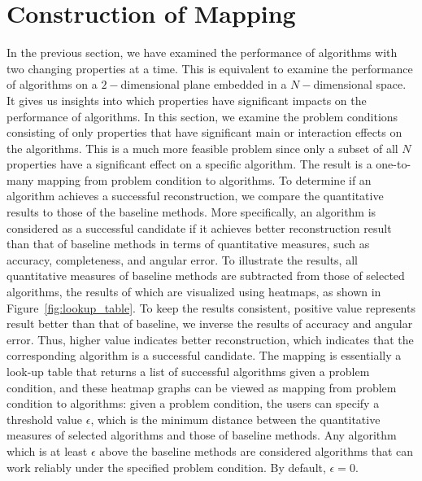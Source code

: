 \section{Construction of Mapping}
\label{sec:lookup_table}
In the previous section, we have examined the performance of algorithms with two changing properties at a time. This is equivalent to examine the performance of algorithms on a $2-$dimensional plane embedded in a $N-$dimensional space. It gives us insights into which properties have significant impacts on the performance of algorithms. In this section, we examine the problem conditions consisting of only properties that have significant main or interaction effects on the algorithms. This is a much more feasible problem since only a subset of all $N$ properties have a significant effect on a specific algorithm. The result is a one-to-many mapping from problem condition to algorithms. To determine if an algorithm achieves a successful reconstruction, we compare the quantitative results to those of the baseline methods. More specifically, an algorithm is considered as a successful candidate if it achieves better reconstruction result than that of baseline methods in terms of quantitative measures, such as accuracy, completeness, and angular error. To illustrate the results, all quantitative measures of baseline methods are subtracted from those of selected algorithms, the results of which are visualized using heatmaps, as shown in Figure~\ref{fig:lookup_table}. To keep the results consistent, \ie positive value represents result better than that of baseline, we inverse the results of accuracy and angular error. Thus, higher value indicates better reconstruction, which indicates that the corresponding algorithm is a successful candidate. The mapping is essentially a look-up table that returns a list of successful algorithms given a problem condition, and these heatmap graphs can be viewed as mapping from problem condition to algorithms: given a problem condition, the users can specify a threshold value $\epsilon$, which is the minimum distance between the quantitative measures of selected algorithms and those of baseline methods. Any algorithm which is at least $\epsilon$ above the baseline methods are considered algorithms that can work reliably under the specified problem condition. By default, $\epsilon = 0$.

